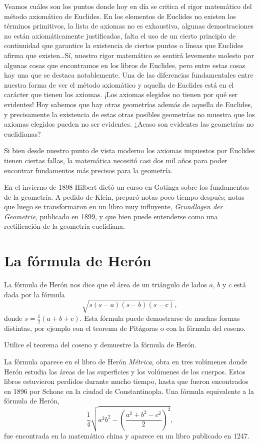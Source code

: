 Veamos cuáles son los puntos donde hoy en día se critica el rigor matemático
del método axiomático de Euclides.  En los elementos de Euclides no existen los
términos primitivos, la lista de axiomas no es exhaustiva, algunas
demostraciones no están axiomáticamente justificadas, falta el uso de un cierto
principio de continuidad que garantice la existencia de ciertos puntos o líneas
que Euclides afirma que existen\dots Sí, nuestro rigor matemático se sentirá
levemente molesto por algunas cosas que encontramos en los libros de Euclides,
pero entre estas cosas hay una que se destaca notablemente. Una de las
diferencias fundamentales entre nuestra forma de ver el método axiomático y
aquella de Euclides está en el carácter que tienen los axiomas. ¡Los axiomas
elegidos no tienen por qué ser evidentes!  Hoy sabemos que hay otras geometrías
además de aquella de Euclides, y precisamente la existencia de estas otras
posibles geometrías no muestra que los axiomas elegidos pueden no ser
evidentes. ¿Acaso son evidentes las geometrías no euclidianas?

Si bien desde nuestro punto de vista moderno los axiomas impuestos por Euclides
tienen ciertas fallas, la matemática necesitó casi dos mil años para poder
encontrar fundamentos más precisos para la geometría. 

En el invierno de 1898
Hilbert dictó un curso en Gotinga sobre los fundamentos de la geometría. A
pedido de Klein, preparó notas poco tiempo después; notas que luego se
transformaron en un libro muy influyente, \emph{Grundlagen der Geometrie},
publicado en 1899, y que bien puede entenderse como una rectificación de la
geometría euclidiana. 

\section*{La fórmula de Herón}

La fórmula de Herón nos dice que el área de un triángulo de lados $a$, $b$ y
$c$ está dada por la fórmula
\[
	\sqrt{s(s-a)(s-b)(s-c)},
\]
donde $s=\frac12(a+b+c)$. Esta fórmula puede demostrarse de muchas formas
distintas, por ejemplo con el teorema de Pitágoras o con la fórmula del coseno.

\begin{exercise}
	Utilice el teorema del coseno y demuestre la fórmula de Herón.
\end{exercise}

La fórmula aparece en el libro de Herón \emph{Métrica}, obra en tres volúmenes
donde Herón estudia las áreas de las superficies y los volúmenes de los
cuerpos. Estos libros estuvieron perdidos durante mucho tiempo,
hasta que fueron encontrados en 1896 por Schone en la ciudad de Constantinopla.
Una fórmula equivalente a la fórmula de Herón,
\[
	\frac14\sqrt{a^2b^2-\left(\frac{a^2+b^2-c^2}{2}\right)^2},
\]
fue encontrada en la matemática china y aparece en un libro publicado en 1247.

